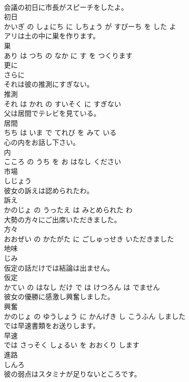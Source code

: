 \documentclass[8pt]{extreport}
\begin{document}
\begin{CJK}{UTF8}{min}
\\	会議の初日に市長がスピーチをしたよ。	
\\	初日 
\\	かいぎ の しょにち に しちょう が すぴーち を した よ			
\\	アリは土の中に巣を作ります。	
\\	巣 
\\	あり は つち の なか に す を つくります			
\\	更に	
\\	さらに			
\\	それは彼の推測にすぎない。	
\\	推測 
\\	それ は かれ の すいそく に すぎない			
\\	父は居間でテレビを見ている。	
\\	居間 
\\	ちち は いま で てれび を みて いる			
\\	心の内をお話し下さい。	
\\	内 
\\	こころ の うち を お はなし ください			
\\	市場	
\\	しじょう			
\\	彼女の訴えは認められたわ。	
\\	訴え 
\\	かのじょ の うったえ は みとめられた わ			
\\	大勢の方々にご出席いただきました。	
\\	方々 
\\	おおぜい の かたがた に ごしゅっせき いただきました			
\\	地味	
\\	じみ			
\\	仮定の話だけでは結論は出ません。	
\\	仮定 
\\	かてい の はなし だけ で は けつろん は でません			
\\	彼女の優勝に感激し興奮しました。	
\\	興奮 
\\	かのじょ の ゆうしょう に かんげき し こうふん しました			
\\	では早速書類をお送りします。	
\\	早速 
\\	では さっそく しょるい を おおくり します			
\\	進路	
\\	しんろ			
\\	彼の弱点はスタミナが足りないところです。	

\end{CJK}
\end{document}
